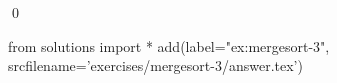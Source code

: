 
\begin{ex} 
  \label{ex:mergesort-3}
  
  \qed
\end{ex} 
\begin{python0}
from solutions import *
add(label="ex:mergesort-3",
    srcfilename='exercises/mergesort-3/answer.tex') 
\end{python0}
